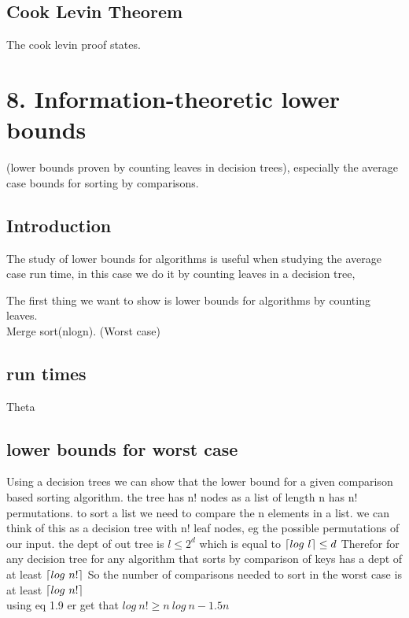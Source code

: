 \documentclass[a4paper,10pt,titlepage]{report}
\DeclarePairedDelimiter{\ceil}{\lceil}{\rceil}
\begin{document}
\subsection{Cook Levin Theorem}
The cook levin proof states.



\newpage
\section{8. Information-theoretic lower bounds}

(lower bounds proven by counting leaves in decision trees), especially the average case bounds for sorting
by comparisons.

\subsection{Introduction}

The study of lower bounds for algorithms is useful when studying the average case run time, in this case we do it by counting leaves in a decision tree,

The first thing we want to show is lower bounds for algorithms by counting leaves.\\

Merge sort(nlogn). (Worst case)\\
\subsection{run times}

Theta

\subsection{lower bounds for worst case}
Using a decision trees we can show that the lower bound for a given comparison based sorting algorithm. the tree has n! nodes as a list of length n has n! permutations. to sort a list we need to compare the n elements in a list. we can think of this as a decision tree with n! leaf nodes, eg the possible permutations of our input. the dept of out tree is $l \leq 2^d$ which is equal to $\ceil{log \ l} \leq d$ Therefor for any decision tree for any algorithm that sorts by comparison of keys has a dept of at least $\ceil{log \ n!}$
So the number of comparisons needed to sort in the worst case is at least $\ceil{log \ n!}$ \\

using eq 1.9 er get that $ log \ n! \geq n \ log \ n - 1.5n$\\
\end{document}
